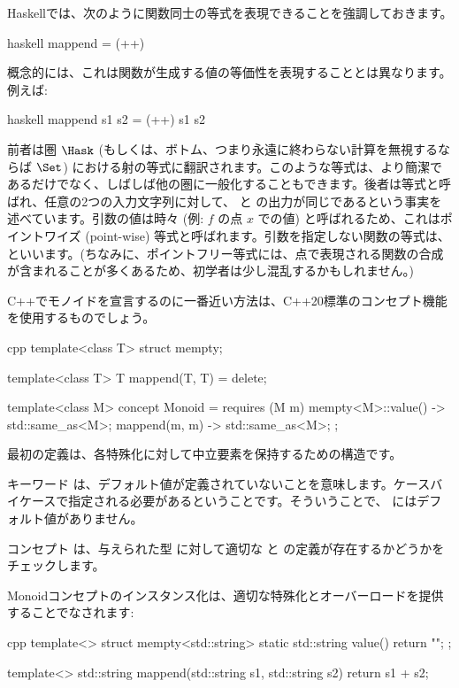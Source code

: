 Haskellでは、次のように関数同士の等式を表現できることを強調しておきます。

\begin{snip}{haskell}
mappend = (++)
\end{snip}
概念的には、これは関数が生成する値の等価性を表現することとは異なります。例えば: 

\begin{snip}{haskell}
mappend s1 s2 = (++) s1 s2
\end{snip}
前者は圏 $\Hask$ (もしくは、ボトム、つまり永遠に終わらない計算を無視するならば $\Set$) における射の等式に翻訳されます。このような等式は、より簡潔であるだけでなく、しばしば他の圏に一般化することもできます。後者は等式と呼ばれ、任意の2つの入力文字列に対して、 と \code{(++)} の出力が同じであるという事実を述べています。引数の値は時々 (例: $f$ の点 $x$ での値) と呼ばれるため、これはポイントワイズ (point-wise) 等式と呼ばれます。引数を指定しない関数の等式は、といいます。(ちなみに、ポイントフリー等式には、点で表現される関数の合成が含まれることが多くあるため、初学者は少し混乱するかもしれません。) 

C++でモノイドを宣言するのに一番近い方法は、C++20標準のコンセプト機能を使用するものでしょう。

\begin{snip}{cpp}
template<class T>
struct mempty;

template<class T>
T mappend(T, T) = delete;

template<class M>
concept Monoid = requires (M m) {
    { mempty<M>::value() } -> std::same_as<M>;
    { mappend(m, m) } -> std::same_as<M>;
};
\end{snip}
最初の定義は、各特殊化に対して中立要素を保持するための構造です。

キーワード  は、デフォルト値が定義されていないことを意味します。ケースバイケースで指定される必要があるということです。そういうことで、 にはデフォルト値がありません。

コンセプト  は、与えられた型  に対して適切な  と  の定義が存在するかどうかをチェックします。

Monoidコンセプトのインスタンス化は、適切な特殊化とオーバーロードを提供することでなされます: 

\begin{snip}{cpp}
template<>
struct mempty<std::string> {
    static std::string value() { return ""; }
};

template<>
std::string mappend(std::string s1, std::string s2) {
    return s1 + s2;
}
\end{snip}

